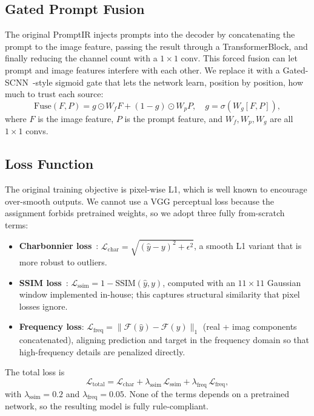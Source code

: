 \documentclass[12pt, a4paper]{article}
\begin{document}
\subsection{Gated Prompt Fusion}
The original PromptIR injects prompts into the decoder by concatenating the prompt to the image feature, passing the result through a TransformerBlock, and finally reducing the channel count with a $1{\times}1$ conv. This forced fusion can let prompt and image features interfere with each other. We replace it with a Gated-SCNN~\cite{takikawa2019gscnn}-style sigmoid gate that lets the network learn, position by position, how much to trust each source:
\begin{equation}
\mathrm{Fuse}(F, P) = g \odot W_f F + (1-g) \odot W_p P,\quad g = \sigma\!\left(W_g [F, P]\right),
\end{equation}
where $F$ is the image feature, $P$ is the prompt feature, and $W_f, W_p, W_g$ are all $1{\times}1$ convs.

\subsection{Loss Function}
The original training objective is pixel-wise L1, which is well known to encourage over-smooth outputs. We cannot use a VGG perceptual loss because the assignment forbids pretrained weights, so we adopt three fully from-scratch terms:
\begin{itemize}
    \item \textbf{Charbonnier loss}~\cite{charbonnier1994two}: $\mathcal{L}_{\text{char}} = \sqrt{(\hat{y}-y)^2 + \epsilon^2}$, a smooth L1 variant that is more robust to outliers.
    \item \textbf{SSIM loss}~\cite{wang2004ssim}: $\mathcal{L}_{\text{ssim}} = 1 - \mathrm{SSIM}(\hat{y}, y)$, computed with an $11{\times}11$ Gaussian window implemented in-house; this captures structural similarity that pixel losses ignore.
    \item \textbf{Frequency loss}: $\mathcal{L}_{\text{freq}} = \|\mathcal{F}(\hat{y}) - \mathcal{F}(y)\|_1$ (real + imag components concatenated), aligning prediction and target in the frequency domain so that high-frequency details are penalized directly.
\end{itemize}
The total loss is
\begin{equation}
\mathcal{L}_{\text{total}} = \mathcal{L}_{\text{char}} + \lambda_{\text{ssim}}\,\mathcal{L}_{\text{ssim}} + \lambda_{\text{freq}}\,\mathcal{L}_{\text{freq}},
\end{equation}
with $\lambda_{\text{ssim}} = 0.2$ and $\lambda_{\text{freq}} = 0.05$. None of the terms depends on a pretrained network, so the resulting model is fully rule-compliant.
\end{document}
